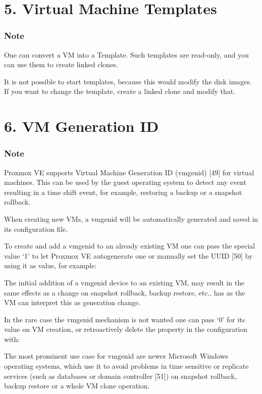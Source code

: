 \section{5. Virtual Machine Templates}

\subsubsection{Note}

One can convert a VM into a Template. Such templates are read-only, and you can use them to create linked clones.

It is not possible to start templates, because this would modify the disk images. If you want to change the template, create a linked clone and modify that.


\section{6. VM Generation ID}

\subsubsection{Note}

Proxmox VE supports Virtual Machine Generation ID (vmgenid) [49] for virtual machines. This can be used by the guest operating system to detect any event resulting in a time shift event, for example, restoring a backup or a snapshot rollback.

When creating new VMs, a vmgenid will be automatically generated and saved in its configuration file.

To create and add a vmgenid to an already existing VM one can pass the special value ‘1’ to let Proxmox VE autogenerate one or manually set the UUID [50] by using it as value, for example:

The initial addition of a vmgenid device to an existing VM, may result in the same effects as a change on snapshot rollback, backup restore, etc., has as the VM can interpret this as generation change.

In the rare case the vmgenid mechanism is not wanted one can pass ‘0’ for its value on VM creation, or retroactively delete the property in the configuration with:

The most prominent use case for vmgenid are newer Microsoft Windows operating systems, which use it to avoid problems in time sensitive or replicate services (such as databases or domain controller [51]) on snapshot rollback, backup restore or a whole VM clone operation.

